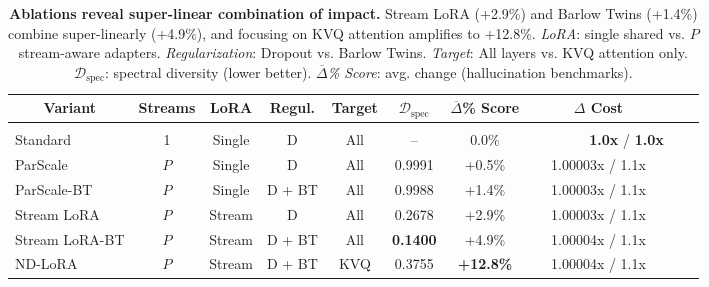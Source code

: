 \documentclass{article} %
\begin{document}
\begin{table}[t]
  \small
  \begin{center}
    \begin{tabular}{l|cccc|ccccc}
      \multicolumn{1}{c}{\bf Variant} &
      \multicolumn{1}{c}{\bf Streams} &
      \multicolumn{1}{c}{\bf LoRA} &
      \multicolumn{1}{c}{\bf Regul.} &
      \multicolumn{1}{c}{\bf Target} &
      \multicolumn{1}{c}{\bf $\mathcal{D}_{\text{spec}}$} &
      \multicolumn{1}{c}{\bf $\overline{\Delta}$\% Score} &
      \multicolumn{1}{c}{\bf $\Delta$ Cost}
      \\ \hline \\[-0.75em]
      Standard       & 1   & Single & D      & All & --              & 0.0\%  & ~~~~~~~~\textbf{1.0x} / \textbf{1.0x} \\
      ParScale       & $P$ & Single & D      & All & 0.9991          & +0.5\%           & 1.00003x / 1.1x \\
      ParScale-BT    & $P$ & Single & D + BT & All & 0.9988          & +1.4\%           & 1.00003x / 1.1x \\
      Stream LoRA    & $P$ & Stream & D      & All & 0.2678          & +2.9\%           & 1.00003x / 1.1x \\
      Stream LoRA-BT & $P$ & Stream & D + BT & All & \textbf{0.1400} & +4.9\%           & 1.00004x / 1.1x \\
      ND-LoRA        & $P$ & Stream & D + BT & KVQ & 0.3755          & \textbf{+12.8\%} & 1.00004x / 1.1x \\
    \end{tabular}
  \end{center}
  \caption{
    \textbf{Ablations reveal super-linear combination of impact.} Stream LoRA (+2.9\%) and Barlow
    Twins (+1.4\%) combine super-linearly (+4.9\%), and focusing on KVQ attention amplifies to +12.8\%.
    {\em LoRA}: single shared vs. $P$ stream-aware adapters.
    {\em Regularization}: Dropout vs. Barlow Twins.
    {\em Target}: All layers vs. KVQ attention only.
    {\em $\mathcal{D}_{\text{spec}}$}: spectral diversity (lower better).
    {\em $\overline{\Delta}$\% Score}: avg. change (hallucination benchmarks).
  }
  \label{tab:ablations}
\end{table}
\end{document}
